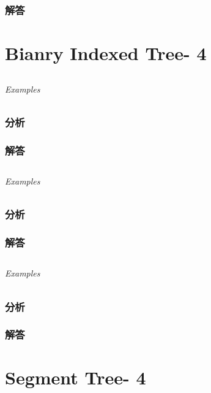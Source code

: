 \documentclass[UTF8,a4paper,12pt]{ctexbook}
\begin{document}
	\subsection{解答}
	
\chapter{Bianry Indexed Tree- 4}
\section{}
	
	\subparagraph{Examples}
	
	\subsection{分析}
	
	\subsection{解答}
	
\section{}
	
	\subparagraph{Examples}
	
	\subsection{分析}
	
	\subsection{解答}
	
\section{}
	
	\subparagraph{Examples}
	
	\subsection{分析}
	
	\subsection{解答}
	
\chapter{Segment Tree- 4}
\end{document}
